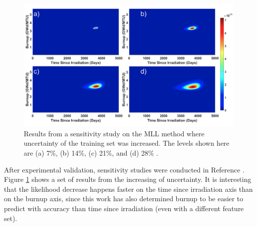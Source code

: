 \begin{figure}[!htb]
  \centering
  \includegraphics[width=\linewidth]{./chapters/litrev/tamu2.png}
  \caption[Sensitivity of likelihood to training set uncertainty]
          {Results from a sensitivity study on the \gls{MLL} method where 
           uncertainty of the training set was increased. The levels shown 
           here are (a) 7\%, (b) 14\%, (c) 21\%, and (d) 28\% 
           \cite{mll_sensitivity}.}
  \label{fig:tamu2}
\end{figure}

After experimental validation, sensitivity studies were conducted in Reference
\cite{mll_sensitivity}.  Figure \ref{fig:tamu2} shows a set of results from the
increasing of uncertainty. It is interesting that the likelihood decrease
happens faster on the time since irradiation axis than on the burnup axis,
since this work has also determined burnup to be easier to predict with
accuracy than time since irradiation (even with a different feature set).
